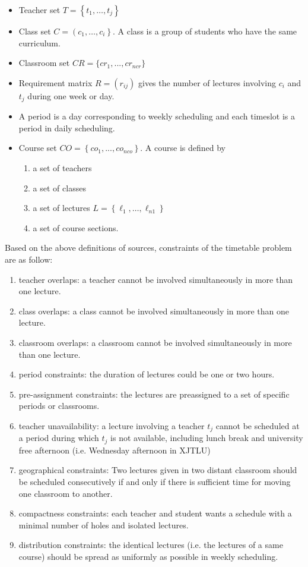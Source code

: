 \documentclass{article}
\begin{document}
\begin{itemize}
	\item Teacher set $T=\left\{t_{1}, \ldots, t_{j}\right\}$
	\item Class set $C=\left(c_{1}, \ldots, c_{i}\right\}$. A class is a group of students who have the same curriculum.
	\item Classroom set $CR=\{cr_{1},...,cr_{ncr}\}$
	\item Requirement matrix $R=(r_{ij})$ gives the number of lectures involving $c_i$ and $t_j$ during one week or day.
	\item A period is a day corresponding to weekly scheduling and each timeslot is a period in daily scheduling.
	\item Course set $CO=\left\{co_{1}, ... , co_{nco}\right\}$. A course is defined by
	      \begin{enumerate}
		      \item a set of teachers
		      \item a set of classes
		      \item a set of lectures $L=\left\{\ell_{1}, \ldots, \ell_{n 1}\right\}$
		      \item a set of course sections.
	      \end{enumerate}
\end{itemize}
Based on the above definitions of sources, constraints of the timetable problem are as follow:
\begin{enumerate}
	\item teacher overlaps: a teacher cannot be involved simultaneously in more than one lecture.
	\item class overlaps: a class cannot be involved simultaneously in more than one lecture.
	\item classroom overlaps: a classroom cannot be involved simultaneously in more than one lecture.
	\item period constraints: the duration of lectures could be one or two hours.
	\item pre-assignment constraints: the lectures are preassigned to a set of specific periods or classrooms.
	\item teacher unavailability: a lecture involving a teacher $t_{j}$ cannot be scheduled at a period during which $t_{j}$ is not available, including lunch break and university free afternoon (i.e. Wednesday afternoon in XJTLU)
	\item  geographical constraints: Two lectures given in two distant classroom should be scheduled consecutively if and only if there is sufficient time for moving one classroom to another.
	\item  compactness constraints: each teacher and student wants a schedule with a minimal number of holes and isolated lectures.
	\item  distribution constraints: the identical lectures (i.e. the lectures of a same course) should be spread as uniformly as possible in weekly scheduling.
\end{enumerate}
\end{document}
